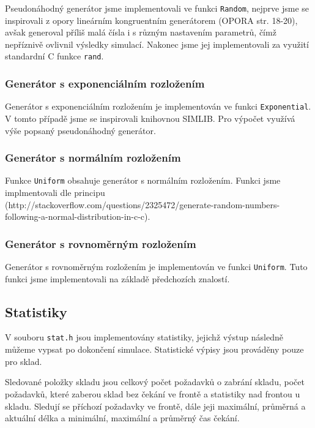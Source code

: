 \documentclass[12pt,a4paper,titlepage,final]{article}
\begin{document}
Pseudonáhodný generátor jsme implementovali ve funkci \texttt{Random}, nejprve jsme se inspirovali z opory lineárním kongruentním generátorem (OPORA str. 18-20), avšak generoval příliš malá čísla i s různým nastavením parametrů, čímž nepříznivě ovlivnil výsledky simulací. Nakonec jsme jej implementovali za využití standardní C funkce \texttt{rand}.

\subsubsection{Generátor s exponenciálním rozložením}

Generátor s exponenciálním rozložením je implementován ve funkci \texttt{Exponential}. V tomto případě jsme se inspirovali knihovnou SIMLIB. Pro výpočet využívá výše popsaný pseudonáhodný generátor.

\subsubsection{Generátor s normálním rozložením}

Funkce \texttt{Uniform} obsahuje generátor s normálním rozložením. Funkci jsme implmentovali dle principu (http://stackoverflow.com/questions/2325472/generate-random-numbers-following-a-normal-distribution-in-c-c).

\subsubsection{Generátor s rovnoměrným rozložením}

Generátor s rovnoměrným rozložením je implementován ve funkci \texttt{Uniform}. Tuto funkci jsme implementovali na základě předchozích znalostí.

\subsection{Statistiky}

V souboru \texttt{stat.h} jsou implementovány statistiky, jejichž výstup následně můžeme vypsat po dokončení simulace. Statistické výpisy jsou prováděny pouze pro sklad. 

Sledované položky skladu jsou celkový počet požadavků o zabrání skladu, počet požadavků, které zaberou sklad bez čekání ve frontě a statistiky nad frontou u skladu. Sledují se příchozí požadavky ve frontě, dále jeji maximální, průměrná a aktuální délka a minimální, maximální a průměrný čas čekání. 
\end{document}
